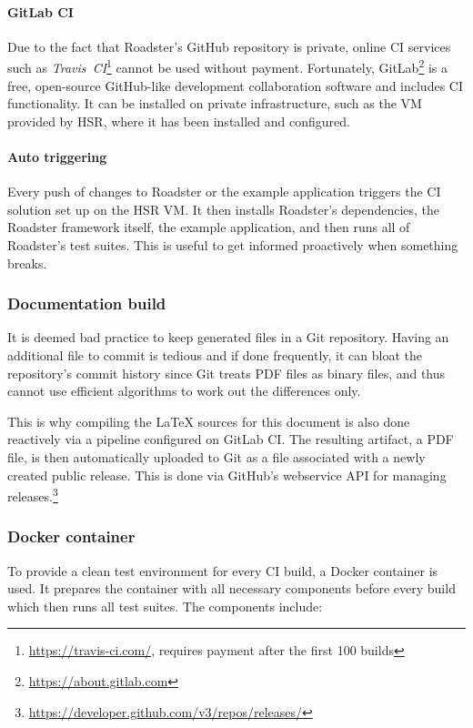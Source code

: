 \paragraph{GitLab CI} Due to the fact that Roadster's GitHub repository is private, online \gls{CI}
services such as \emph{Travis~CI}\footnote{\url{https://travis-ci.com/}, requires payment after the
first 100 builds} cannot be used without payment. Fortunately,
GitLab\footnote{\url{https://about.gitlab.com}} is a free, open-source GitHub-like development collaboration software and includes CI functionality. It can be installed on private infrastructure, such as the
\gls{VM} provided by HSR, where it has been installed and configured.

\paragraph{Auto triggering} Every push of changes to Roadster or the example application triggers the CI
solution set up on the HSR VM. It then installs Roadster's dependencies, the Roadster
framework itself, the example application, and then runs all of Roadster's test
suites. This is useful to get informed proactively when something breaks.

\subsubsection{Documentation build}
It is deemed bad practice to keep generated files in a Git
repository. Having an additional file to commit is tedious and if done
frequently, it can bloat the repository's commit history since Git treats PDF
files as binary files, and thus cannot use efficient algorithms to work out the
differences only.

This is why compiling the \LaTeX{} sources for this document is also done reactively
via a pipeline configured on GitLab CI. The resulting artifact, a PDF file, is
then automatically uploaded to Git as a file associated with a newly created
public release. This is done via GitHub's webservice API for managing
releases.\footnote{\url{https://developer.github.com/v3/repos/releases/}}


\subsubsection{Docker container}
To provide a clean test environment for every CI build, a Docker container is used.
It prepares the container with all necessary components before every build
which then runs all test suites. The components include:

